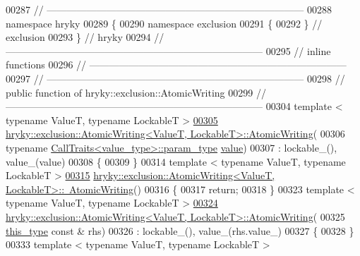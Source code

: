 \begin{DoxyCode}
{{{00287 \textcolor{comment}{//
      ------------------------------------------------------------------------------}
00288 \textcolor{keyword}{namespace }hryky
00289 \{
00290 \textcolor{keyword}{namespace }exclusion
00291 \{
00292 \} \textcolor{comment}{// exclusion}
00293 \} \textcolor{comment}{// hryky}
00294 \textcolor{comment}{//
      ------------------------------------------------------------------------------}
00295 \textcolor{comment}{// inline functions}
00296 \textcolor{comment}{//
      ------------------------------------------------------------------------------}
00297 \textcolor{comment}{//
      ------------------------------------------------------------------------------}
00298 \textcolor{comment}{// public function of hryky::exclusion::AtomicWriting}
00299 \textcolor{comment}{//
      ------------------------------------------------------------------------------}
00304 \textcolor{comment}{}\textcolor{keyword}{template} < \textcolor{keyword}{typename} ValueT, \textcolor{keyword}{typename} LockableT >
\hypertarget{exclusion__atomic_8h_source_l00305}{}\hyperlink{group__exclusion__control_ga2f63c0a66bb7b03eed3607ae9d14d126}{00305} \hyperlink{classhryky_1_1exclusion_1_1_atomic_writing_a53b4f66f0702e2c4ca4705468827af7a}{hryky::exclusion::AtomicWriting<ValueT, LockableT>::AtomicWriting}(
00306     \textcolor{keyword}{typename} \hyperlink{classhryky_1_1_call_traits}{CallTraits<value_type>::param_type} \hyperlink{namespacehryky_1_1log_1_1format_a5b9af9c1a7b018d54144acfb1b8cc960}{value})
00307     : lockable\_(), value\_(value)
00308 \{
00309 \}
00314 \textcolor{keyword}{template} < \textcolor{keyword}{typename} ValueT, \textcolor{keyword}{typename} LockableT >
\hypertarget{exclusion__atomic_8h_source_l00315}{}\hyperlink{group__exclusion__control_gaaff919108eef9ef3545064188cba65f0}{00315} \hyperlink{classhryky_1_1exclusion_1_1_atomic_writing}{hryky::exclusion::AtomicWriting<ValueT, LockableT>::~AtomicWriting}()
00316 \{
00317     \textcolor{keywordflow}{return};
00318 \}
00323 \textcolor{keyword}{template} < \textcolor{keyword}{typename} ValueT, \textcolor{keyword}{typename} LockableT >
\hypertarget{exclusion__atomic_8h_source_l00324}{}\hyperlink{group__exclusion__control_gac7297c603e75cf09b560894b0dedeb68}{00324} \hyperlink{classhryky_1_1exclusion_1_1_atomic_writing}{hryky::exclusion::AtomicWriting<ValueT, LockableT>::AtomicWriting}(
00325     \hyperlink{classhryky_1_1exclusion_1_1_atomic_writing}{this_type} \textcolor{keyword}{const} & rhs)
00326     : lockable\_(), value\_(rhs.value\_)
00327 \{
00328 \}
00333 \textcolor{keyword}{template} < \textcolor{keyword}{typename} ValueT, \textcolor{keyword}{typename} LockableT >
}}}
\end{DoxyCode}
